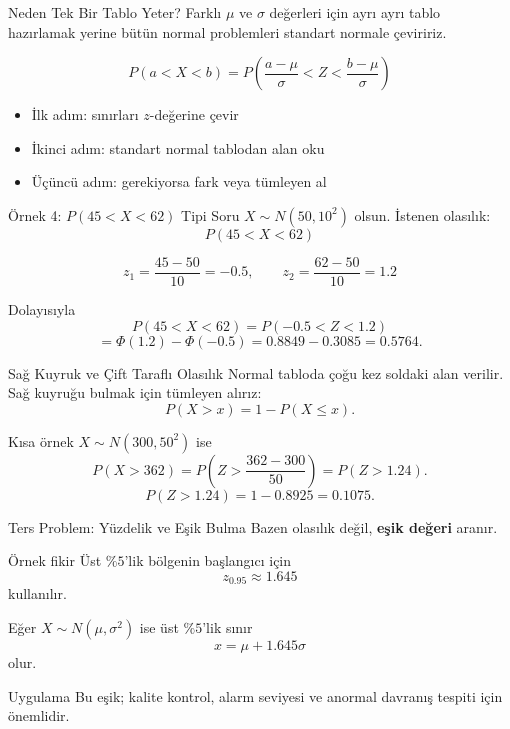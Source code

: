 \documentclass[light]{lutbeamer}
\begin{document}
\begin{frame}{Neden Tek Bir Tablo Yeter?}
    \small
    Farklı \(\mu\) ve \(\sigma\) değerleri için ayrı ayrı tablo hazırlamak yerine bütün normal problemleri standart normale çeviririz.

    \[
    P(a<X<b)=P\left(\frac{a-\mu}{\sigma}<Z<\frac{b-\mu}{\sigma}\right)
    \]

    \begin{itemize}
        \item İlk adım: sınırları \(z\)-değerine çevir
        \item İkinci adım: standart normal tablodan alan oku
        \item Üçüncü adım: gerekiyorsa fark veya tümleyen al
    \end{itemize}
\end{frame}

\begin{frame}{Örnek 4: \(P(45<X<62)\) Tipi Soru}
    \small
    \(X \sim N(50,10^2)\) olsun. İstenen olasılık:
    \[
    P(45<X<62)
    \]

    \[
    z_1=\frac{45-50}{10}=-0.5, \qquad
    z_2=\frac{62-50}{10}=1.2
    \]

    Dolayısıyla
    \[
    P(45<X<62)=P(-0.5<Z<1.2)
    \]
    \[
    =\Phi(1.2)-\Phi(-0.5)=0.8849-0.3085=0.5764.
    \]
\end{frame}

\begin{frame}{Sağ Kuyruk ve Çift Taraflı Olasılık}
    \small
    Normal tabloda çoğu kez soldaki alan verilir. Sağ kuyruğu bulmak için tümleyen alırız:
    \[
    P(X>x)=1-P(X\le x).
    \]

    \begin{exampleblock}{Kısa örnek}
        \(X \sim N(300,50^2)\) ise
        \[
        P(X>362)=P\left(Z>\frac{362-300}{50}\right)=P(Z>1.24).
        \]
        \[
        P(Z>1.24)=1-0.8925=0.1075.
        \]
    \end{exampleblock}
\end{frame}

\begin{frame}{Ters Problem: Yüzdelik ve Eşik Bulma}
    \small
    Bazen olasılık değil, \textbf{eşik değeri} aranır.

    \begin{block}{Örnek fikir}
        Üst \(\%5\)'lik bölgenin başlangıcı için
        \[
        z_{0.95}\approx 1.645
        \]
        kullanılır.
    \end{block}

    Eğer \(X \sim N(\mu,\sigma^2)\) ise üst \(\%5\)'lik sınır
    \[
    x=\mu+1.645\sigma
    \]
    olur.

    \begin{alertblock}{Uygulama}
        Bu eşik; kalite kontrol, alarm seviyesi ve anormal davranış tespiti için önemlidir.
    \end{alertblock}
\end{frame}
\end{document}
